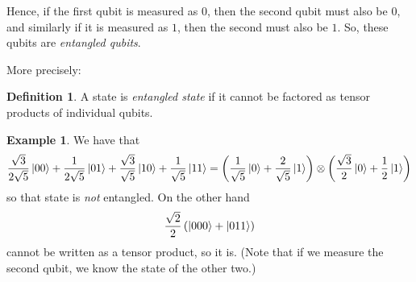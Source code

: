 \documentclass[12pt]{amsart}
\theoremstyle{plain}
\theoremstyle{definition}
\newtheorem{definition}[theorem]{Definition}
\theoremstyle{remarks}
\newtheorem{example}[theorem]{Example}
\begin{document}
Hence, if the first qubit is measured as $0$, then the second qubit must also be $0$, and similarly if it is measured as $1$, then the second must also be $1$.  So, these qubits are \emph{entangled qubits}.

More precisely:

\begin{definition}
  A state is \emph{entangled state} if it cannot be factored as tensor products of individual qubits.
\end{definition}

\begin{example}
  We have that
  \[
    \frac{\sqrt{3}}{2\sqrt{5}} \ket{00} + \frac{1}{2\sqrt{5}} \ket{01} + \frac{\sqrt{3}}{\sqrt{5}} \ket{10} + \frac{1}{\sqrt{5}} \ket{11} = \left(\frac{1}{\sqrt{5}}\ket{0} + \frac{2}{\sqrt{5}} \ket{1}\right) \otimes \left(\frac{\sqrt{3}}{2} \ket{0} + \frac{1}{2} \ket{1}\right)
  \]
  so that state is \emph{not} entangled.  On the other hand
  \[
    \frac{\sqrt{2}}{2}\left( \ket{000} + \ket{011} \right)
  \]
  cannot be written as a tensor product, so it is.  (Note that if we measure the second qubit, we know the state of the other two.)
\end{example}
\end{document}

